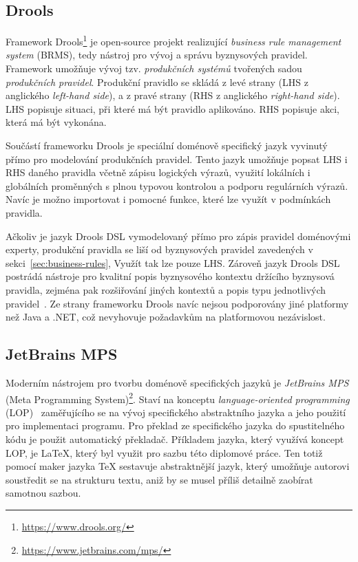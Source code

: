 \subsection{Drools}\label{sec:drools}

Framework Drools\footnote{\url{https://www.drools.org/}} je open-source projekt realizující
\textit{business rule management system} (\gls{BRMS}), tedy nástroj pro vývoj a správu byznysových
pravidel. Framework umožňuje vývoj tzv. \textit{produkčních systémů} tvořených sadou \textit{produkčních pravidel}.
Produkční pravidlo se skládá z levé strany (\gls{LHS} z anglického \textit{left-hand side}),
a z pravé strany (\gls{RHS} z anglického \textit{right-hand side}).
\gls{LHS} popisuje situaci, při které má být pravidlo aplikováno. \gls{RHS} popisuje akci,
která má být vykonána.

Součástí frameworku Drools je speciální doménově specifický jazyk vyvinutý přímo
pro modelování produkčních pravidel. Tento jazyk umožňuje popsat \gls{LHS} i \gls{RHS}
daného pravidla včetně zápisu logických výrazů, využití lokálních i globálních proměnných
s plnou typovou kontrolou a podporu regulárních výrazů. Navíc je možno importovat i pomocné funkce, které lze
využít v podmínkách pravidla.

Ačkoliv je jazyk Drools \gls{DSL} vymodelovaný přímo pro zápis pravidel doménovými experty,
produkční pravidla se liší od byznysových pravidel zavedených v sekci~\ref{sec:business-rules},
Využít tak lze pouze \gls{LHS}. Zároveň jazyk Drools \gls{DSL} postrádá
nástroje pro kvalitní popis byznysového kontextu držícího byznysová pravidla,
zejména pak rozšiřování jiných kontextů a popis typu jednotlivých pravidel~\cite{cemus2017automated}.
Ze strany frameworku Drools navíc nejsou podporovány jiné platformy než Java a .NET, což nevyhovuje
požadavkům na platformovou nezávislost.

\subsection{JetBrains MPS}

Moderním nástrojem pro tvorbu doménově specifických jazyků je \textit{JetBrains MPS}
(Meta Programming System)\footnote{\url{https://www.jetbrains.com/mps/}}.
Staví na konceptu \textit{language-oriented programming} (\gls{LOP})~\cite{ward1994language} zaměřujícího
se na vývoj specifického abstraktního jazyka a jeho použití pro implementaci programu. Pro překlad ze specifického
jazyka do spustitelného kódu je použit automatický překladač. Příkladem jazyka, který využívá koncept \gls{LOP},
je \LaTeX\xspace, který byl využit pro sazbu této diplomové práce. Ten totiž pomocí maker jazyka \TeX\xspace
sestavuje abstraktnější jazyk, který umožňuje autorovi soustředit se na strukturu textu, aniž by
se musel příliš detailně zaobírat samotnou sazbou.


